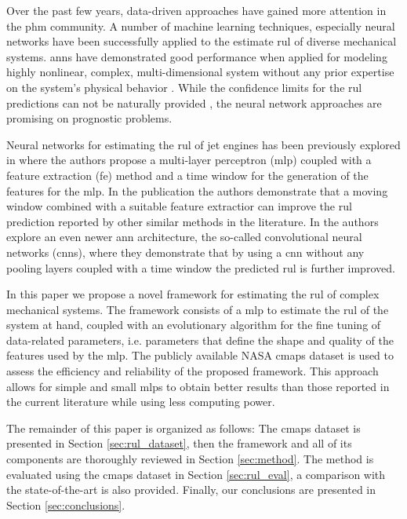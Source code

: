 \documentclass{article}
\begin{document}
Over the past few years, data-driven approaches have gained more attention in the \gls{phm} community. A number of machine learning techniques, especially neural networks have been successfully applied to the estimate \gls{rul} of diverse mechanical systems. \glspl{ann} have demonstrated good performance when applied for modeling highly nonlinear, complex, multi-dimensional system without any prior expertise on the system's physical behavior \cite{Li2018}. While the confidence limits for the \gls{rul} predictions can not be naturally provided \cite{Sikorska2011}, the neural network approaches are promising on prognostic problems.

Neural networks for estimating the \gls{rul} of jet engines has been previously explored in \cite{Lim2016} where the authors propose a multi-layer perceptron (\gls{mlp}) coupled with a feature extraction (\gls{fe}) method and a time window for the generation of the features for the \gls{mlp}. In the publication the authors demonstrate that a moving window combined with a suitable feature extractior can improve the \gls{rul} prediction reported by other similar methods in the literature. In \cite{Li2018} the authors explore an even newer \gls{ann} architecture, the so-called convolutional neural networks (\glspl{cnn}), where they demonstrate that by using a \gls{cnn} without any pooling layers coupled with a time window the predicted \gls{rul} is further improved.

In this paper we propose a novel framework for estimating the \gls{rul} of complex mechanical systems. The framework consists of a \gls{mlp} to estimate the \gls{rul} of the system at hand, coupled with an evolutionary algorithm for the fine tuning of data-related parameters, i.e. parameters that define the shape and quality of the features used by the \gls{mlp}. The publicly available NASA \gls{cmaps} dataset \cite{CMAPS2008} is used to assess the efficiency and reliability of the proposed framework. This approach allows for simple and small \glspl{mlp} to obtain better results than those reported in the current literature while using less computing power. 

The remainder of this paper is organized as follows: The \gls{cmaps} dataset is presented in Section \ref{sec:rul_dataset}, then the framework and all of its components are thoroughly reviewed in Section \ref{sec:method}. The method is evaluated using the \gls{cmaps} dataset in Section \ref{sec:rul_eval}, a comparison with the state-of-the-art is also provided. Finally, our conclusions are presented in Section \ref{sec:conclusions}.
\end{document}
